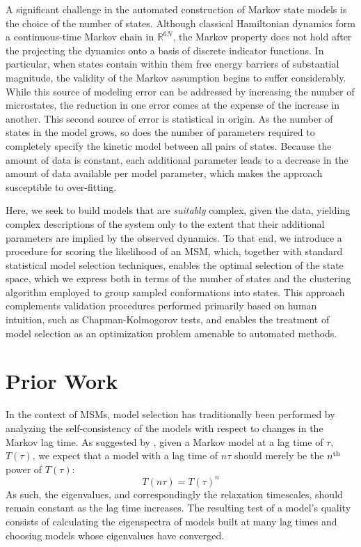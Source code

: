 \documentclass[journal=jpcbfk, layout=twocolumn, manuscript=article]{achemso}
\begin{document}
A significant challenge in the automated construction of Markov state models is the choice of the number of states\cite{McGibbon2013Learning}. Although classical Hamiltonian dynamics form a continuous-time Markov chain in $\mathbb{R}^{6N}$, the Markov property does not hold after the projecting the dynamics onto a basis of discrete indicator functions. In particular, when states contain within them free energy barriers of substantial magnitude, the validity of the Markov assumption begins to suffer considerably. While this source of modeling error can be addressed by increasing the number of microstates, the reduction in one error comes at the expense of the increase in another. This second source of error is statistical in origin. As the number of states in the model grows, so does the number of parameters required to completely specify the kinetic model between all pairs of states. Because the amount of data is constant, each additional parameter leads to a decrease in the amount of data available per model parameter, which makes the approach susceptible to over-fitting.

Here, we seek to build models that are \emph{suitably} complex, given the data, yielding complex descriptions of the system only to the extent that their additional parameters are implied by the observed dynamics. To that end, we introduce a procedure for scoring the likelihood of an MSM, which, together with standard statistical model selection techniques, enables the optimal selection of the state space, which we express both in terms of the number of states and the clustering algorithm employed to group sampled conformations into states. This approach complements validation procedures performed primarily based on human intuition, such as Chapman-Kolmogorov tests, and enables the treatment of model selection as an optimization problem amenable to automated methods.

\section{Prior Work}
In the context of MSMs, model selection has traditionally been performed by analyzing the self-consistency of the models with respect to changes in the Markov lag time. As suggested by \citet{Swope2004Describing}, given a Markov model at a lag time of $\tau$, $T(\tau)$, we expect that a model with a lag time of $n\tau$ should merely be the $n^\textnormal{th}$ power of $T(\tau)$:
$$ T(n\tau) = T(\tau)^n $$ As such, the eigenvalues, and correspondingly the relaxation timescales, should remain constant as the lag time increases. The resulting test of a model's quality consists of calculating the eigenspectra of models built at many lag times and choosing models whose eigenvalues have converged. 
\end{document}
